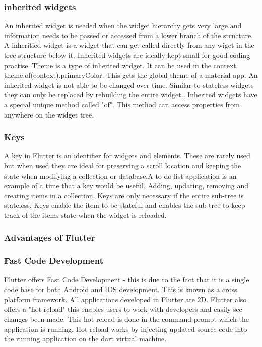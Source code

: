 \subsubsection{inherited widgets}
An inherited widget is needed when the widget hierarchy gets very large and  information needs to be passed or accessed from a lower branch of the structure. A inheritied widget is a widget that can get called directly from any wiget in the tree structure below it. Inherited widgets are ideally kept small for good coding practise.\cite{fidanboylu_2019}.Theme is a type of inherited widget. It can be used in the context theme.of(context).primaryColor. This gets the global theme of a material app. An inherited widget is not able to be changed over time. Similar to stateless widgets they can only be replaced by rebuilding the entire widget.\cite{inherited_widgets}. Inherited widgets have a special unique method called "of". This method can access properties from anywhere on the widget tree.\cite{inheritedwidget_2018}

\subsubsection{Keys}
A key in Flutter is an identifier for widgets and elements. These are rarely used but when used they are ideal for preserving a scroll location and keeping the state when modifying a collection or database.\cite{key_widgets}A to do list application is an example of a time that a key would be useful. Adding, updating, removing and creating items in a collection. Keys are only necessary if the entire sub-tree is stateless. Keys enable the item to be stateful and enables the sub-tree to keep track of the items state when the widget is reloaded. \cite{keys}

\subsubsection{Advantages of Flutter}

\subsubsection{Fast Code Development}
Flutter offers Fast Code Development - this is due to the fact that it is a single code base for both Android and IOS development. This is known as a cross platform framework. All applications developed in Flutter are 2D. Flutter also offers a "hot reload" this enables users to work with developers and easily see changes been made. This hot reload is done in the command prompt which the application is running. Hot reload works by injecting updated source code into the running application on the dart virtual machine.\cite{faq_2019}
